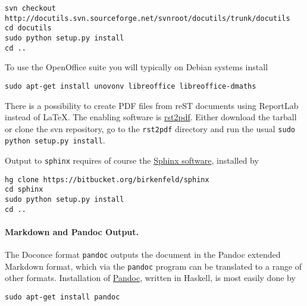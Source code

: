 \documentclass[%
oneside,                 %
final,                   %
10pt]{article}
\begin{document}
\vspace{4pt}
\begin{Verbatim}[numbers=none,frame=lines,label=\fbox{{\tiny Terminal}},fontsize=\fontsize{9pt}{9pt},
labelposition=topline,framesep=2.5mm,framerule=0.7pt]
svn checkout http://docutils.svn.sourceforge.net/svnroot/docutils/trunk/docutils
cd docutils
sudo python setup.py install
cd ..
\end{Verbatim}
To use the OpenOffice suite you will typically on Debian systems install
\vspace{4pt}
\begin{Verbatim}[numbers=none,frame=lines,label=\fbox{{\tiny Terminal}},fontsize=\fontsize{9pt}{9pt},
labelposition=topline,framesep=2.5mm,framerule=0.7pt]
sudo apt-get install unovonv libreoffice libreoffice-dmaths
\end{Verbatim}

There is a possibility to create PDF files from reST documents
using ReportLab instead of {\LaTeX}. The enabling software is
\href{{http://code.google.com/p/rst2pdf}}{rst2pdf}. Either download the tarball
or clone the svn repository, go to the {\fontsize{10pt}{10pt}\Verb!rst2pdf!} directory and
run the usual {\fontsize{10pt}{10pt}\Verb!sudo python setup.py install!}.


Output to {\fontsize{10pt}{10pt}\Verb!sphinx!} requires of course the
\href{{http://sphinx.pocoo.org}}{Sphinx software},
installed by

\vspace{4pt}
\begin{Verbatim}[numbers=none,frame=lines,label=\fbox{{\tiny Terminal}},fontsize=\fontsize{9pt}{9pt},
labelposition=topline,framesep=2.5mm,framerule=0.7pt]
hg clone https://bitbucket.org/birkenfeld/sphinx
cd sphinx
sudo python setup.py install
cd ..
\end{Verbatim}

\paragraph{Markdown and Pandoc Output.}
The Doconce format {\fontsize{10pt}{10pt}\Verb!pandoc!} outputs the document in the Pandoc
extended Markdown format, which via the {\fontsize{10pt}{10pt}\Verb!pandoc!} program can be
translated to a range of other formats. Installation of \href{{http://johnmacfarlane.net/pandoc/}}{Pandoc}, written in Haskell, is most
easily done by

\vspace{4pt}
\begin{Verbatim}[numbers=none,frame=lines,label=\fbox{{\tiny Terminal}},fontsize=\fontsize{9pt}{9pt},
labelposition=topline,framesep=2.5mm,framerule=0.7pt]
sudo apt-get install pandoc
\end{Verbatim}
\end{document}
